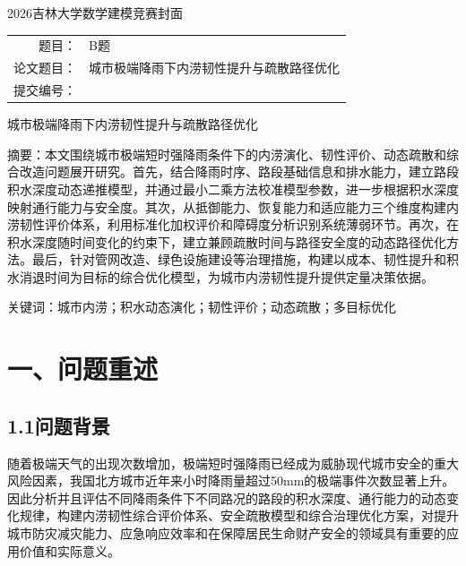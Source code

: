 \documentclass[UTF8,a4paper,12pt]{ctexart}
\begin{document}
\thispagestyle{empty}
\begin{center}
\vspace*{2.5cm}
{\heiti{}2026吉林大学数学建模竞赛封面\par}
\vspace{2.2cm}
{\songti{}\begin{tabular}{rl}
题目：& B题\\[0.8cm]
论文题目：& 城市极端降雨下内涝韧性提升与疏散路径优化\\[0.8cm]
提交编号：& \underline{\hspace{4cm}}\\[0.8cm]
\end{tabular}\par}
\vfill
\end{center}
\clearpage
\setcounter{page}{1}
\songti{}
\begin{center}
{\heiti{}城市极端降雨下内涝韧性提升与疏散路径优化\par}
\end{center}
\vspace{1em}
{\heiti 摘要：}本文围绕城市极端短时强降雨条件下的内涝演化、韧性评价、动态疏散和综合改造问题展开研究。首先，结合降雨时序、路段基础信息和排水能力，建立路段积水深度动态递推模型，并通过最小二乘方法校准模型参数，进一步根据积水深度映射通行能力与安全度。其次，从抵御能力、恢复能力和适应能力三个维度构建内涝韧性评价体系，利用标准化加权评价和障碍度分析识别系统薄弱环节。再次，在积水深度随时间变化的约束下，建立兼顾疏散时间与路径安全度的动态路径优化方法。最后，针对管网改造、绿色设施建设等治理措施，构建以成本、韧性提升和积水消退时间为目标的综合优化模型，为城市内涝韧性提升提供定量决策依据。

{\heiti 关键词：}城市内涝；积水动态演化；韧性评价；动态疏散；多目标优化
\clearpage
\songti{}
\section{一、问题重述}

\subsection{1.1问题背景}

随着极端天气的出现次数增加，极端短时强降雨已经成为威胁现代城市安全的重大风险因素，我国北方城市近年来小时降雨量超过50mm的极端事件次数显著上升。因此分析并且评估不同降雨条件下不同路况的路段的积水深度、通行能力的动态变化规律，构建内涝韧性综合评价体系、安全疏散模型和综合治理优化方案，对提升城市防灾减灾能力、应急响应效率和在保障居民生命财产安全的领域具有重要的应用价值和实际意义。
\end{document}
